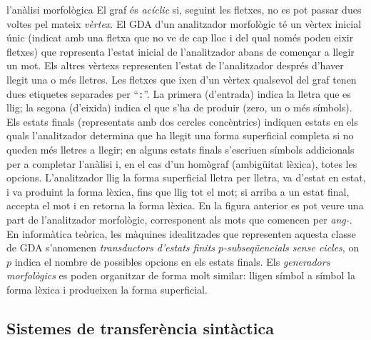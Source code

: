 \begin{persabermes}{l'anàlisi morfològica}
El graf és {\em
  acíclic} si, seguint les fletxes, no es pot passar dues voltes pel
mateix \emph{vèrtex}. El GDA d'un analitzador morfològic té un vèrtex
inicial únic (indicat amb una fletxa que no ve de cap lloc i del qual
només poden eixir fletxes) que representa l'estat inicial de
l'analitzador abans de començar a llegir un mot. Els altres vèrtexs
representen l'estat de l'analitzador després d'haver llegit una o més
lletres. Les fletxes que ixen d'un vèrtex qualsevol del graf tenen
dues etiquetes separades per ``{\tt :}''. La primera (d'entrada)
indica la lletra que es llig; la segona (d'eixida) indica el que s'ha
de produir (zero, un o més símbols). Els estats finals (representats
amb dos cercles concèntrics) indiquen estats en els quals
l'analitzador determina que ha llegit una forma superficial completa
si no queden més lletres a llegir; en alguns estats finals s'escriuen
símbols addicionals per a completar l'anàlisi i, en el cas d'un
homògraf (ambigüitat lèxica), totes les opcions. L'analitzador llig la
forma superficial lletra per lletra, va d'estat en estat, i va
produint la forma lèxica, fins que llig tot el mot; si arriba a un
estat final, accepta el mot i en retorna la forma lèxica. En la
figura anterior es pot veure una part de l'analitzador morfològic,
corresponent als mots que comencen per \emph{ang-}. En informàtica
teòrica, les màquines idealitzades que representen aquesta classe de
GDA s'anomenen \emph{transductors d'estats finits $p$-subseqüencials
  sense cicles}, on $p$ indica el nombre de possibles opcions en els
estats finals. Els \emph{generadors morfològics} es poden organitzar
de forma molt similar: lligen símbol a símbol la forma lèxica i
produeixen la forma superficial.



\mbox{}
\end{persabermes}




\subsection{Sistemes de transferència sintàctica} 
\label{s3:transyn}

